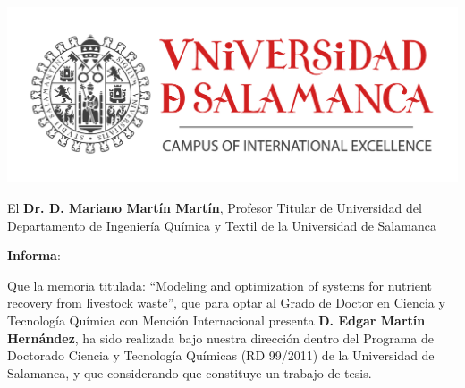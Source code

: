 


\includegraphics[scale=0.22]{gfx/Logo_Usal_Hor_Eng_2012}%


\bigskip

El \textbf{Dr. D. Mariano Martín Martín}, Profesor Titular de Universidad del Departamento de Ingeniería
Química y Textil de la Universidad de Salamanca

\bigskip
\textbf{Informa}: 
\bigskip

Que  la  memoria  titulada: ``Modeling and optimization of systems for nutrient recovery from livestock waste'', que para optar al Grado de Doctor en Ciencia y Tecnología Química 
con Mención Internacional presenta  \textbf{D. Edgar Martín Hernández}, ha sido realizada bajo nuestra dirección dentro del Programa de Doctorado Ciencia y Tecnología 
Químicas (RD  99/2011) de la Universidad de Salamanca, y que considerando que constituye un trabajo de tesis.

